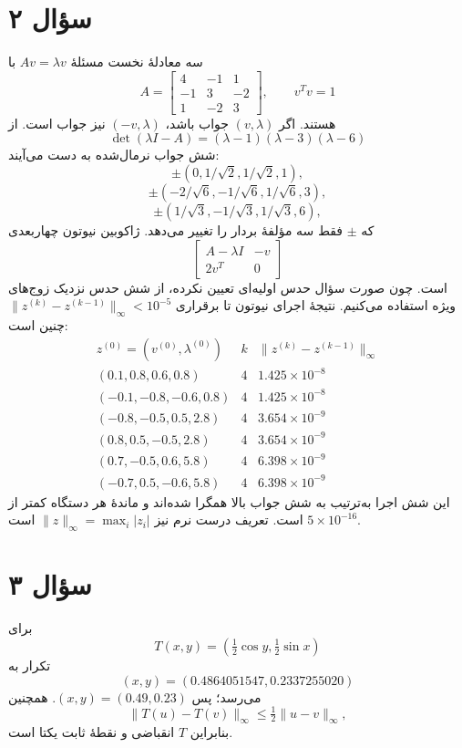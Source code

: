 \documentclass[12pt]{article}
\begin{document}
\section*{سؤال ۲}
سه معادلهٔ نخست مسئلهٔ \(Av=\lambda v\) با
\[
 A=\begin{bmatrix}4&-1&1\\-1&3&-2\\1&-2&3\end{bmatrix},\qquad v^Tv=1
\]
هستند. اگر \((v,\lambda)\) جواب باشد، \((-v,\lambda)\) نیز جواب است. از
\[
 \det(\lambda I-A)=(\lambda-1)(\lambda-3)(\lambda-6)
\]
شش جواب نرمال‌شده به دست می‌آیند:
\[
 \boxed{\pm(0,1/\sqrt2,1/\sqrt2,1)},
\]
\[
 \boxed{\pm(-2/\sqrt6,-1/\sqrt6,1/\sqrt6,3)},
\]
\[
 \boxed{\pm(1/\sqrt3,-1/\sqrt3,1/\sqrt3,6)},
\]
که \(\pm\) فقط سه مؤلفهٔ بردار را تغییر می‌دهد. ژاکوبین نیوتون چهاربعدی
\[
 \begin{bmatrix}A-\lambda I&-v\\2v^T&0\end{bmatrix}
\]
است. چون صورت سؤال حدس اولیه‌ای تعیین نکرده، از شش حدس نزدیک زوج‌های ویژه استفاده می‌کنیم. نتیجهٔ اجرای نیوتون تا برقراری
\(\|z^{(k)}-z^{(k-1)}\|_\infty<10^{-5}\) چنین است:
\[
\begin{array}{c|c|c}
z^{(0)}=(v^{(0)},\lambda^{(0)})&k&
\|z^{(k)}-z^{(k-1)}\|_\infty\\ \hline
(0.1,0.8,0.6,0.8)&4&1.425\times10^{-8}\\
(-0.1,-0.8,-0.6,0.8)&4&1.425\times10^{-8}\\
(-0.8,-0.5,0.5,2.8)&4&3.654\times10^{-9}\\
(0.8,0.5,-0.5,2.8)&4&3.654\times10^{-9}\\
(0.7,-0.5,0.6,5.8)&4&6.398\times10^{-9}\\
(-0.7,0.5,-0.6,5.8)&4&6.398\times10^{-9}
\end{array}
\]
این شش اجرا به‌ترتیب به شش جواب بالا همگرا شده‌اند و ماندهٔ هر دستگاه کمتر از
\(5\times10^{-16}\) است. تعریف درست نرم نیز
\(\|z\|_\infty=\max_i|z_i|\) است.

\section*{سؤال ۳}
برای
\[
 T(x,y)=\left(\tfrac12\cos y,\tfrac12\sin x\right)
\]
تکرار به
\[
 (x,y)=(0.4864051547,0.2337255020)
\]
می‌رسد؛ پس \(\boxed{(x,y)=(0.49,0.23)}\). همچنین
\[
 \|T(u)-T(v)\|_\infty\leq\tfrac12\|u-v\|_\infty,
\]
بنابراین \(T\) انقباضی و نقطهٔ ثابت یکتا است.
\end{document}
